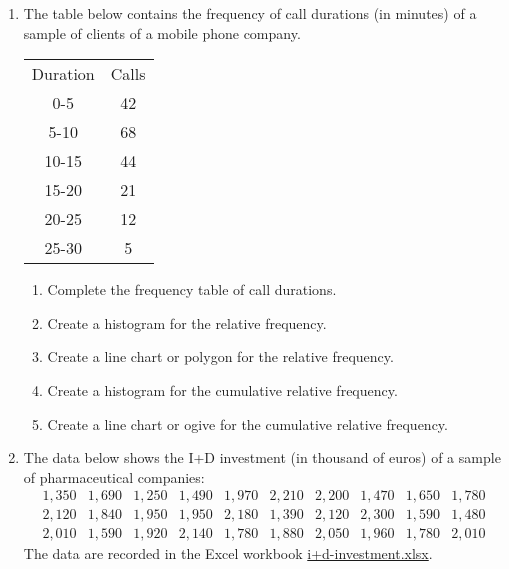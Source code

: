 \begin{enumerate}[leftmargin=*,resume]
\item The table below contains the frequency of call durations (in minutes) of a sample of clients of a mobile phone
company.
\begin{center}
\begin{tabular}{cc}
\toprule
Duration & Calls\\
0-5 & 42\\
5-10 & 68\\
10-15 & 44\\
15-20 & 21\\
20-25 & 12\\
25-30 & 5\\
\bottomrule
\end{tabular}
\end{center}
\begin{enumerate}
\item Complete the frequency table of call durations. 
\item Create a histogram for the relative frequency.
\item Create a line chart or polygon for the relative frequency. 
\item Create a histogram for the cumulative relative frequency. 
\item Create a line chart or ogive for the cumulative relative frequency. 
\end{enumerate}


\item\label{i+d-investment} The data below shows the I+D investment (in thousand of euros) of a sample of pharmaceutical companies:
\[
\begin{array}{rrrrrrrrrr}
1,350 & 1,690 & 1,250 & 1,490 & 1,970 & 2,210 & 2,200 & 1,470 & 1,650 & 1,780 \\
2,120 & 1,840 & 1,950 & 1,950 & 2,180 & 1,390 & 2,120 & 2,300 & 1,590 & 1,480 \\
2,010 & 1,590 & 1,920 & 2,140 & 1,780 & 1,880 & 2,050 & 1,960 & 1,780 & 2,010 
\end{array}
\]
The data are recorded in the Excel workbook \href{http://aprendeconalf.es/office/excel/exercises/descriptive-statistics/i+d-investment.xlsx}{\textsf{i+d-investment.xlsx}}.


\end{enumerate}
